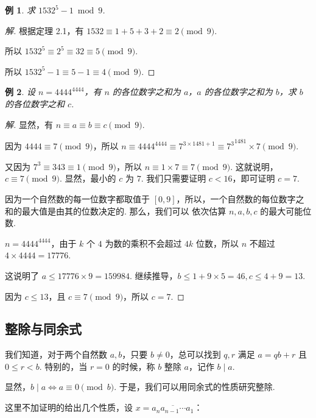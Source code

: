 \documentclass[a4paper]{article}
\newtheorem{exam}{例}[subsection]
\begin{document}
\begin{exam}
    求 $1532^5-1\bmod 9$.
\end{exam}

\begin{proof}[解]
    根据定理 2.1，有 $1532\equiv 1+5+3+2\equiv 2 \pmod 9$.

    所以 $1532^5\equiv 2^5\equiv 32 \equiv 5 \pmod 9$.

    所以 $1532^5-1\equiv 5-1 \equiv 4 \pmod 9$.
\end{proof}

\begin{exam}
    设 $n=4444^{4444}$，有 $n$ 的各位数字之和为 $a$，$a$ 的各位数字之和为 $b$，求 $b$ 的各位数字之和 $c$.
\end{exam}

\begin{proof}[解]
    显然，有 $n\equiv a\equiv b \equiv c\pmod 9$.

    因为 $4444\equiv 7\pmod 9$，所以 $n\equiv 4444^{4444}\equiv 7^{3\times 1481+1}\equiv {7^3}^{1481}\times
        7\pmod 9$.

    又因为 $7^3\equiv 343\equiv 1\pmod 9$，所以 $n\equiv 1\times 7\equiv 7 \pmod 9$. 这就说明，$c\equiv 7
        \pmod 9$. 显然，最小的 $c$ 为 $7$. 我们只需要证明 $c<16$，即可证明 $c=7$.

    因为一个自然数的每一位数字都取值于 $[0,9]$，所以，一个自然数的每位数字之和的最大值是由其的位数决定的. 那么，我们可以
    依次估算 $n,a,b,c$ 的最大可能位数.

    $n=4444^{4444}$，由于 $k$ 个 $4$ 为数的乘积不会超过 $4k$ 位数，所以 $n$ 不超过 $4\times 4444=17776$.

    这说明了 $a\le 17776\times 9=159984$. 继续推导，$b\le 1+9\times 5=46,c\le 4+9=13$.

    因为 $c\le 13$，且 $c\equiv 7\pmod 9$，所以 $c=7$.
\end{proof}

\subsection{整除与同余式}

我们知道，对于两个自然数 $a,b$，只要 $b\ne 0$，总可以找到 $q,r$ 满足 $a=qb+r$ 且 $0\le r < b$. 特别的，当 $r=0$
的时候，称 $b$ 整除 $a$，记作 $b\mid a$.

显然，$b\mid a\Leftrightarrow a\equiv 0\pmod b$. 于是，我们可以用同余式的性质研究整除.

这里不加证明的给出几个性质，设 $x=\overline{a_na_{n-1}\cdots a_1}$：
\end{document}
